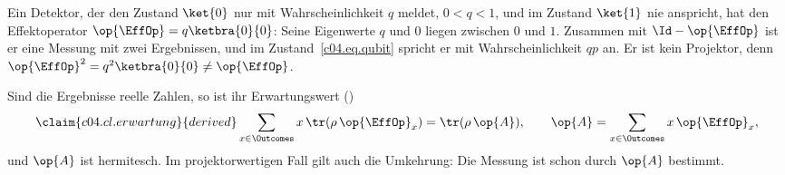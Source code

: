 \begin{example}\label{c04.ex.wirkungsgrad}
  Ein Detektor, der den Zustand $\ket{0}$ nur mit Wahrscheinlichkeit $q$ meldet, $0 < q < 1$, und
  im Zustand $\ket{1}$ nie anspricht, hat den Effektoperator $\op{\EffOp} = q\ketbra{0}{0}$: Seine Eigenwerte $q$ und $0$ liegen
  zwischen $0$ und $1$. Zusammen mit $\Id - \op{\EffOp}$ ist er eine Messung mit zwei Ergebnissen, und
  im Zustand~\eqref{c04.eq.qubit} spricht er mit Wahrscheinlichkeit $q p$ an. Er ist kein
  Projektor, denn $\op{\EffOp}^2 = q^2 \ketbra{0}{0} \neq \op{\EffOp}$.
\end{example}

Sind die Ergebnisse reelle Zahlen, so ist ihr Erwartungswert ()
\begin{equation}\label{c04.eq.erwartung}\claim{c04.cl.erwartung}{derived}
  \sum_{x \in \Outcomes} x\, \tr(\rho\,\op{\EffOp}_x) = \tr(\rho\, \op{A}) ,
  \qquad
  \op{A} = \sum_{x \in \Outcomes} x\, \op{\EffOp}_x ,
\end{equation}
und $\op{A}$ ist hermitesch. Im projektorwertigen Fall gilt auch die Umkehrung: Die Messung ist
schon durch $\op{A}$ bestimmt.

